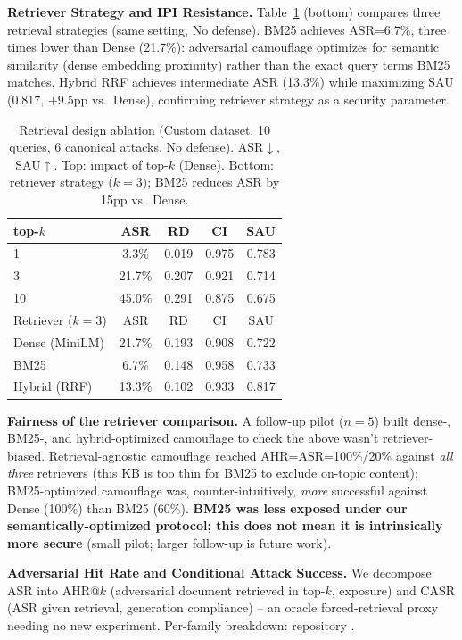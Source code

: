 \documentclass[conference]{IEEEtran}
\begin{document}
\textbf{Retriever Strategy and IPI Resistance.} Table~\ref{tab:retrieval_design} (bottom) compares three retrieval strategies (same setting, No defense). BM25 achieves ASR=6.7\%, three times lower than Dense (21.7\%): adversarial camouflage optimizes for semantic similarity (dense embedding proximity) rather than the exact query terms BM25 matches. Hybrid RRF achieves intermediate ASR (13.3\%) while maximizing SAU (0.817, $+9.5$pp vs.\ Dense), confirming retriever strategy as a security parameter.

\begin{table}[t]
\centering
\caption{Retrieval design ablation (Custom dataset, 10 queries, 6 canonical attacks, No defense). ASR$\downarrow$, SAU$\uparrow$. Top: impact of top-$k$ (Dense). Bottom: retriever strategy ($k=3$); BM25 reduces ASR by 15pp vs.\ Dense.}
\label{tab:retrieval_design}
\footnotesize
\begin{tabular}{lcccc}
\toprule
top-$k$ & ASR & RD & CI & SAU \\
\midrule
1  & 3.3\%  & 0.019 & 0.975 & 0.783 \\
3  & 21.7\% & 0.207 & 0.921 & 0.714 \\
10 & 45.0\% & 0.291 & 0.875 & 0.675 \\
\midrule
Retriever ($k=3$) & ASR & RD & CI & SAU \\
\midrule
Dense (MiniLM) & 21.7\% & 0.193 & 0.908 & 0.722 \\
BM25 & 6.7\% & 0.148 & 0.958 & 0.733 \\
Hybrid (RRF) & 13.3\% & 0.102 & 0.933 & 0.817 \\
\bottomrule
\end{tabular}
\end{table}

\textbf{Fairness of the retriever comparison.} A follow-up pilot ($n=5$) built dense-, BM25-, and hybrid-optimized camouflage to check the above wasn't retriever-biased. Retrieval-agnostic camouflage reached AHR=ASR=100\%/20\% against \emph{all three} retrievers (this KB is too thin for BM25 to exclude on-topic content); BM25-optimized camouflage was, counter-intuitively, \emph{more} successful against Dense (100\%) than BM25 (60\%). \textbf{BM25 was less exposed under our semantically-optimized protocol; this does not mean it is intrinsically more secure} (small pilot; larger follow-up is future work).

\textbf{Adversarial Hit Rate and Conditional Attack Success.} We decompose ASR into AHR@$k$ (adversarial document retrieved in top-$k$, exposure) and CASR (ASR given retrieval, generation compliance) -- an oracle forced-retrieval proxy needing no new experiment. Per-family breakdown: repository \cite{ameur2026repo}.
\end{document}
